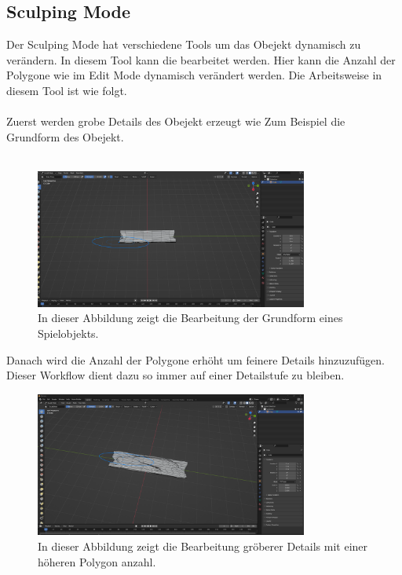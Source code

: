 \subsection{Sculping Mode}
Der Sculping Mode hat verschiedene Tools um das Obejekt dynamisch zu verändern. In diesem Tool kann die  bearbeitet werden. Hier kann die Anzahl der Polygone wie im Edit Mode dynamisch verändert werden. Die Arbeitsweise in diesem Tool ist wie folgt.\\\\
Zuerst werden grobe Details des Obejekt erzeugt wie Zum Beispiel die Grundform des Obejekt.\\\\
\begin{figure}[H]
    \centering
    \includegraphics[width=0.8\textwidth]{chapters/13/images/HolzBrett.png}
    \caption{In dieser Abbildung zeigt die Bearbeitung der Grundform eines Spielobjekts.}
    \label{UST-14}
\end{figure}
\noindent Danach wird die Anzahl der Polygone erhöht um feinere Details hinzuzufügen. Dieser Workflow dient dazu so immer auf einer Detailstufe zu bleiben.
\begin{figure}[H]
    \centering
    \includegraphics[width=0.8\textwidth]{chapters/13/images/HolzBrett1.png}
    \caption{In dieser Abbildung zeigt die Bearbeitung gröberer Details mit einer höheren Polygon anzahl.}
    \label{UST-15}
\end{figure}
